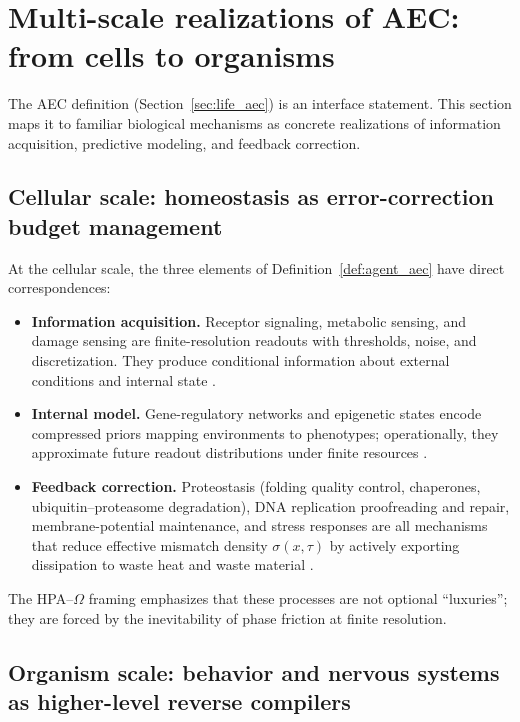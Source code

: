 \section{Multi-scale realizations of AEC: from cells to organisms}
\label{sec:multiscale}

The AEC definition (Section~\ref{sec:life_aec}) is an interface statement.
This section maps it to familiar biological mechanisms as concrete realizations of information acquisition, predictive modeling, and feedback correction.

\subsection{Cellular scale: homeostasis as error-correction budget management}
\label{sec:cell_scale}

At the cellular scale, the three elements of Definition~\ref{def:agent_aec} have direct correspondences:
\begin{itemize}
  \item \textbf{Information acquisition.}
  Receptor signaling, metabolic sensing, and damage sensing are finite-resolution readouts with thresholds, noise, and discretization.
  They produce conditional information about external conditions and internal state \cite{Alberts2014}.
  \item \textbf{Internal model.}
  Gene-regulatory networks and epigenetic states encode compressed priors mapping environments to phenotypes; operationally, they approximate future readout distributions under finite resources \cite{Alberts2014}.
  \item \textbf{Feedback correction.}
  Proteostasis (folding quality control, chaperones, ubiquitin--proteasome degradation), DNA replication proofreading and repair, membrane-potential maintenance, and stress responses are all mechanisms that reduce effective mismatch density $\sigma(x,\tau)$ by actively exporting dissipation to waste heat and waste material \cite{Alberts2014,Lindahl1993,Hopfield1974,Ninio1975}.
\end{itemize}
The HPA--$\Omega$ framing emphasizes that these processes are not optional ``luxuries''; they are forced by the inevitability of phase friction at finite resolution.

\subsection{Organism scale: behavior and nervous systems as higher-level reverse compilers}
\label{sec:organism_scale}

